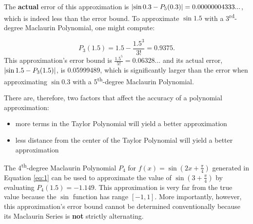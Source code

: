 \documentclass[10pt]{article}
\theoremstyle{definition}
\DeclarePairedDelimiter{\abs}{\lvert}{\rvert}
\begin{document}
The \textbf{actual} error of this approximation is $\abs*{\sin 0.3 - P_5(0.3)}=0.00000004333...$, which is indeed less than the error bound. To approximate $\sin 1.5$ with a 3\textsuperscript{rd}-degree Maclaurin Polynomial, one might compute:

\[P_3(1.5)=1.5-\frac{1.5^3}{3!}=0.9375.\]
This approximation's error bound is $\frac{1.5^5}{5!}=0.06328...$ and its actual error, $\abs*{\sin 1.5 - P_3(1.5)}$, is 0.05999489, which is significantly larger than the error when approximating $\sin 0.3$ with a 5\textsuperscript{th}-degree Maclaurin Polynomial.

\newpage

There are, therefore, two factors that affect the accuracy of a polynomial approximation:
\begin{itemize}
    \item more terms in the Taylor Polynomial will yield a better approximation
    \item less distance from the center of the Taylor Polynomial will yield a better approximation
\end{itemize}

The 4\textsuperscript{th}-degree Maclaurin Polynomial $P_4$ for $f(x)=\sin\left(2x+\frac{\pi}{4}\right)$ generated in Equation \ref{eq:1} can be used to approximate the value of $\sin \left(3+\frac{\pi}{4}\right)$ by evaluating $P_4(1.5)=-1.149$. This approximation is very far from the true value because the $\sin$ function has range $[-1,1]$. More importantly, however, this approximation's error bound cannot be determined conventionally because its Maclaurin Series is \textbf{not} strictly alternating.

\begin{center}
\end{center}
\end{document}
